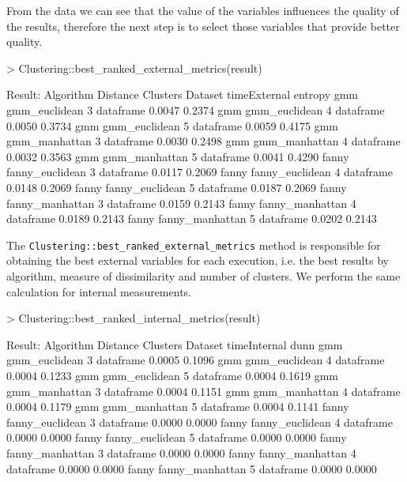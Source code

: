 From the data we can see that the value of the variables influences the quality of the results, therefore the next step is to select those variables that provide better quality.

\begin{Schunk}
\begin{Sinput}
> Clustering::best_ranked_external_metrics(result)
\end{Sinput}
\begin{Soutput}
Result:
Algorithm  Distance         Clusters   Dataset  timeExternal entropy
  gmm        gmm_euclidean     3      dataframe    0.0047    0.2374
  gmm        gmm_euclidean     4      dataframe    0.0050    0.3734
  gmm        gmm_euclidean     5      dataframe    0.0059    0.4175
  gmm        gmm_manhattan     3      dataframe    0.0030    0.2498
  gmm        gmm_manhattan     4      dataframe    0.0032    0.3563
  gmm        gmm_manhattan     5      dataframe    0.0041    0.4290
fanny      fanny_euclidean     3      dataframe    0.0117    0.2069
fanny      fanny_euclidean     4      dataframe    0.0148    0.2069
fanny      fanny_euclidean     5      dataframe    0.0187    0.2069
fanny      fanny_manhattan     3      dataframe    0.0159    0.2143
fanny      fanny_manhattan     4      dataframe    0.0189    0.2143
fanny      fanny_manhattan     5      dataframe    0.0202    0.2143
\end{Soutput}
\end{Schunk}

The \texttt{Clustering::best\_ranked\_external\_metrics} method is responsible for obtaining the best external variables for each execution, i.e. the best results by algorithm, measure of dissimilarity and number of clusters. We perform the same calculation for internal measurements.

\begin{Schunk}
\begin{Sinput}
> Clustering::best_ranked_internal_metrics(result)
\end{Sinput}
\begin{Soutput}
Result:
Algorithm      Distance     Clusters   Dataset  timeInternal   dunn
   gmm       gmm_euclidean     3      dataframe   0.0005      0.1096
   gmm       gmm_euclidean     4      dataframe   0.0004      0.1233
   gmm       gmm_euclidean     5      dataframe   0.0004      0.1619
   gmm       gmm_manhattan     3      dataframe   0.0004      0.1151
   gmm       gmm_manhattan     4      dataframe   0.0004      0.1179
   gmm       gmm_manhattan     5      dataframe   0.0004      0.1141
 fanny     fanny_euclidean     3      dataframe   0.0000      0.0000
 fanny     fanny_euclidean     4      dataframe   0.0000      0.0000
 fanny     fanny_euclidean     5      dataframe   0.0000      0.0000
 fanny     fanny_manhattan     3      dataframe   0.0000      0.0000
 fanny     fanny_manhattan     4      dataframe   0.0000      0.0000
 fanny     fanny_manhattan     5      dataframe   0.0000      0.0000
\end{Soutput}
\end{Schunk}

